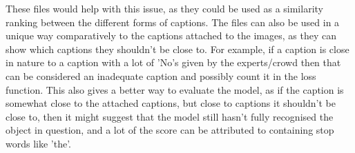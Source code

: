 \documentclass{article}
\begin{document}
    These files would help with this issue, as they could be used as a similarity ranking between the different forms of captions. The files can also be used in a unique way comparatively to the captions attached to the images, as they can show which captions they shouldn't be close to. For example, if a caption is close in nature to a caption with a lot of 'No's given by the experts/crowd then that can be considered an inadequate caption and possibly count it in the loss function. This also gives a better way to evaluate the model, as if the caption is somewhat close to the attached captions, but close to captions it shouldn't be close to, then it might suggest that the model still hasn't fully recognised the object in question, and a lot of the score can be attributed to containing stop words like 'the'.



\end{document}
